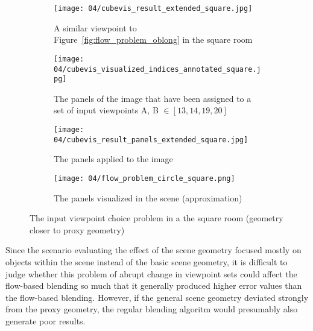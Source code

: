 \begin{figure}
\centering
    \hfill
    \begin{subfigure}[c]{0.45\textwidth}
            \centering
            \texttt{[image: 04/cubevis\_result\_extended\_square.jpg]}
            \caption{A similar viewpoint to Figure~\ref{fig:flow_problem_oblong} in the square room}
    \end{subfigure}
    \hfill
    \begin{subfigure}[c]{0.45\textwidth}
            \centering
            \texttt{[image: 04/cubevis\_visualized\_indices\_annotated\_square.jpg]}
            \caption{The panels of the image that have been assigned to a set of input viewpoints A, B $\in [13, 14, 19, 20]$}
    \end{subfigure}
    \hfill

    \hfill
    \begin{subfigure}[c]{0.45\textwidth}
            \centering
            \texttt{[image: 04/cubevis\_result\_panels\_extended\_square.jpg]}
            \caption{The panels applied to the image}
    \end{subfigure}
    \hfill
    \begin{subfigure}[c]{0.45\textwidth}
            \centering
            \texttt{[image: 04/flow\_problem\_circle\_square.png]}
            \caption{The panels visualized in the scene (approximation)}
    \end{subfigure}
    \hfill
  \caption{The input viewpoint choice problem in a the square room (geometry closer to proxy geometry)} \label{fig:flow_problem_square}
\end{figure}

Since the scenario evaluating the effect of the scene geometry focused mostly on objects within the scene instead of the basic scene geometry, it is difficult to judge whether this problem of abrupt change in viewpoint sets could affect the flow-based blending so much that it generally produced higher error values than the flow-based blending. However, if the general scene geometry deviated strongly from the proxy geometry, the regular blending algoritm would presumably also generate poor results.

